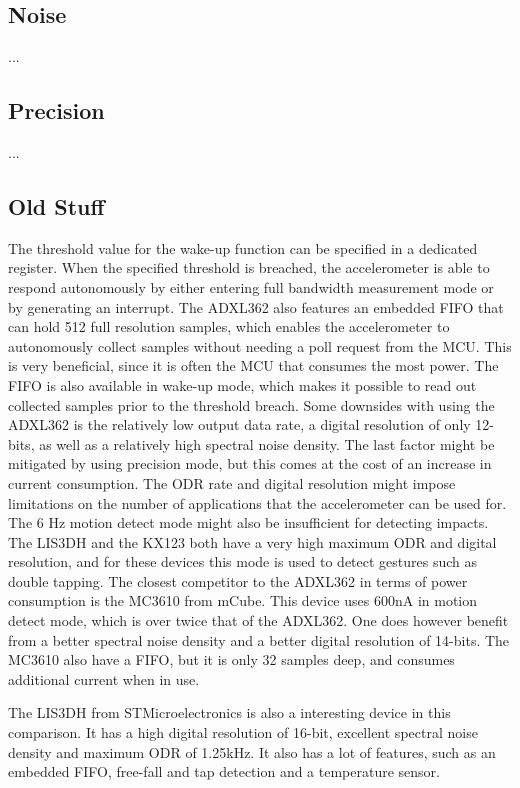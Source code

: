\subsection{Noise}

...

\subsection{Precision}

...

\subsection{Old Stuff}

The threshold value for the wake-up function can be specified in a dedicated register. When the specified threshold is breached, the accelerometer is able to respond autonomously by either entering full bandwidth measurement mode or by generating an interrupt. The ADXL362 also features an embedded FIFO that can hold 512 full resolution samples, which enables the accelerometer to autonomously collect samples without needing a poll request from the MCU. This is very beneficial, since it is often the MCU that consumes the most power. The FIFO is also available in wake-up mode, which makes it possible to read out collected samples prior to the threshold breach. Some downsides with using the ADXL362 is the relatively low output data rate, a digital resolution of only 12-bits, as well as a relatively high spectral noise density. The last factor might be mitigated by using precision mode, but this comes at the cost of an increase in current consumption. The ODR rate and digital resolution might impose limitations on the number of applications that the accelerometer can be used for. The 6 Hz motion detect mode might also be insufficient for detecting impacts. The LIS3DH and the KX123 both have a very high maximum ODR and digital resolution, and for these devices this mode is used to detect gestures such as double tapping. The closest competitor to the ADXL362 in terms of power consumption is the MC3610 from mCube. This device uses 600nA in motion detect mode, which is over twice that of the ADXL362. One does however benefit from a better spectral noise density and a better digital resolution of 14-bits. The MC3610 also have a FIFO, but it is only 32 samples deep, and consumes additional current when in use. 

The LIS3DH from STMicroelectronics is also a interesting device in this comparison. It has a high digital resolution of 16-bit, excellent spectral noise density and maximum ODR of 1.25kHz. It also has a lot of features, such as an embedded FIFO, free-fall and tap detection and a temperature sensor. 


